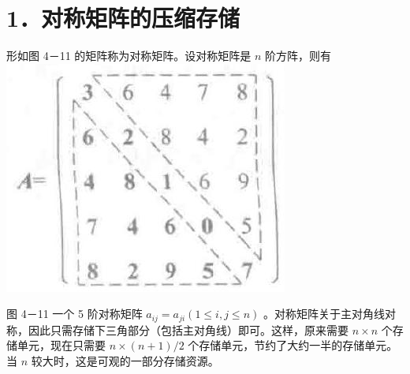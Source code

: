 \documentclass[10pt]{article}
\begin{document}
\section*{1．对称矩阵的压缩存储}
形如图 4－11 的矩阵称为对称矩阵。设对称矩阵是 $n$ 阶方阵，则有\\
\includegraphics[max width=\textwidth, center]{2025_06_06_704745ea57b15b2333e5g-122}

图 4－11 一个 5 阶对称矩阵 $a_{i j}=a_{j i}(1 \leqslant i, j \leqslant n)$ 。对称矩阵关于主对角线对称，因此只需存储下三角部分（包括主对角线）即可。这样，原来需要 $n \times n$ 个存储单元，现在只需要 $n \times(n+1) / 2$ 个存储单元，节约了大约一半的存储单元。当 $n$ 较大时，这是可观的一部分存储资源。
\end{document}
